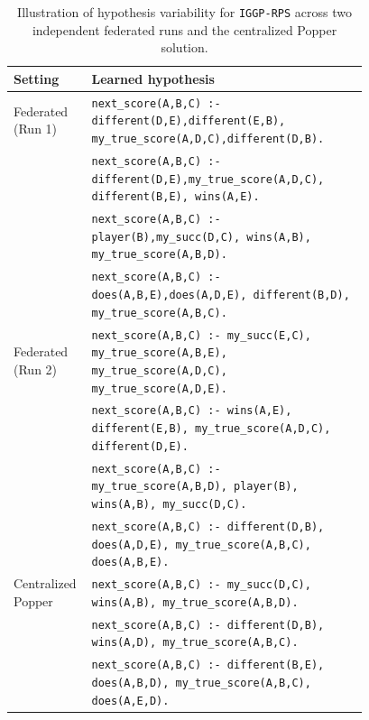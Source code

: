 \begin{table}[ht]
\centering
\scriptsize
\caption{Illustration of hypothesis variability for \texttt{IGGP-RPS} across two independent federated runs and the centralized Popper solution.}

\label{tab:hypotheses-iggp}
\setlength{\tabcolsep}{6pt}
\begin{tabular}{l|p{0.78\linewidth}}
\toprule
\textbf{Setting} & \textbf{Learned hypothesis} \\
\midrule

Federated (Run 1) &
\texttt{next\_score(A,B,C) :- different(D,E),different(E,B), my\_true\_score(A,D,C),different(D,B).} \\
& \texttt{next\_score(A,B,C) :- different(D,E),my\_true\_score(A,D,C), different(B,E), wins(A,E).} \\
& \texttt{next\_score(A,B,C) :- player(B),my\_succ(D,C), wins(A,B), my\_true\_score(A,B,D).} \\
& \texttt{next\_score(A,B,C) :- does(A,B,E),does(A,D,E), different(B,D),
my\_true\_score(A,B,C).}
\\
\midrule

Federated (Run 2) &
\texttt{next\_score(A,B,C) :- my\_succ(E,C), my\_true\_score(A,B,E), my\_true\_score(A,D,C), my\_true\_score(A,D,E).} \\
& \texttt{next\_score(A,B,C) :- wins(A,E), different(E,B), my\_true\_score(A,D,C), different(D,E).} \\
& \texttt{next\_score(A,B,C) :- my\_true\_score(A,B,D), player(B), wins(A,B), my\_succ(D,C).} \\
& \texttt{next\_score(A,B,C) :- different(D,B), does(A,D,E), my\_true\_score(A,B,C), does(A,B,E).}
\\
\midrule

Centralized Popper &
\texttt{next\_score(A,B,C) :- my\_succ(D,C), wins(A,B), my\_true\_score(A,B,D).} \\
& \texttt{next\_score(A,B,C) :- different(D,B), wins(A,D), my\_true\_score(A,B,C).} \\
& \texttt{next\_score(A,B,C) :- different(B,E), does(A,B,D), my\_true\_score(A,B,C), does(A,E,D).}
\\

\bottomrule
\end{tabular}
\end{table}




